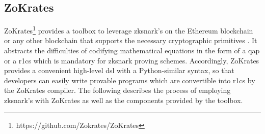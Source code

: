 


\subsection{ZoKrates}
\label{subsec:zokrates}

ZoKrates\footnote{https://github.com/Zokrates/ZoKrates} provides a toolbox to leverage \acrshort{zksnark}'s on the Ethereum blockchain or any other blockchain that supports the necessary cryptographic primitives \cite{eberhardtZoKratesScalablePrivacyPreserving2018a}. It abstracts the difficulties of codifying mathematical equations in the form of a \acrfull{qap} or a \acrfull{r1cs} which is mandatory for \acrshort{zksnark} proving schemes. Accordingly, ZoKrates provides a convenient high-level \acrfull{dsl} with a Python-similar syntax, so that developers can easily write provable programs which are convertible into \acrshort{r1cs} by the ZoKrates compiler. The following describes the process of employing \acrshort{zksnark}'s with ZoKrates as well as the components provided by the toolbox.

